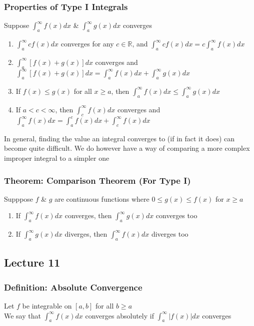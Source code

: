 \documentclass[12pt, letterpaper]{article}
\begin{document}
\subsubsection{Properties of Type I Integrals}
Suppose $\displaystyle\int_{a}^{\infty}f(x)dx$ \& $\displaystyle\int_{a}^{\infty}g(x)dx$ converges 
\begin{enumerate}
    \item $\displaystyle\int_{a}^{\infty}cf(x)dx$ converges for any $c\in\mathbb{R}$, and $\displaystyle\int_{a}^{\infty}cf(x)dx = c\int_{a}^{\infty}f(x)dx$
    \item $\displaystyle\int_{a}^{\infty}[f(x)+g(x)]dx$ converges and $\displaystyle\int_{a}^{\infty}[f(x)+g(x)]dx = \int_{a}^{\infty}f(x)dx + \int_{a}^{\infty}g(x)dx$
    \item If $f(x) \leq g(x)$ for all $x\geq a$, then $\displaystyle\int_{a}^{\infty}f(x)dx \leq \int_{a}^{\infty}g(x)dx$
    \item If $a<c<\infty$, then $\displaystyle\int_{c}^{\infty}f(x)dx$ converges and $\displaystyle\int_{a}^{\infty}f(x)dx = \int_{a}^{c}f(x)dx + \int_{c}^{\infty}f(x)dx$
\end{enumerate}
In general, finding the value an integral converges to (if in fact it does) can become quite difficult. We do however have a way of 
comparing a more complex improper integral to a simpler one 
\subsubsection{Theorem: Comparison Theorem (For Type I)}
Supppose $f$ \& $g$ are continuous functions where $0\leq g(x)\leq f(x)$ for $x\geq a$
\begin{enumerate}
    \item If $\displaystyle\int_{a}^{\infty}f(x)dx$ converges, then $\displaystyle\int_{a}^{\infty}g(x)dx$ converges too 
    \item If $\displaystyle\int_{a}^{\infty}g(x)dx$ diverges, then $\displaystyle\int_{a}^{\infty}f(x)dx$ diverges too 
\end{enumerate}
\subsection{Lecture 11}
\subsubsection{Definition: Absolute Convergence}
Let $f$ be integrable on $[a,b]$ for all $b\geq a$ \\
We say that $\displaystyle\int_{a}^{\infty}f(x)dx$ converges absolutely if $\displaystyle\int_{a}^{\infty}|f(x)|dx$ converges
\end{document}

